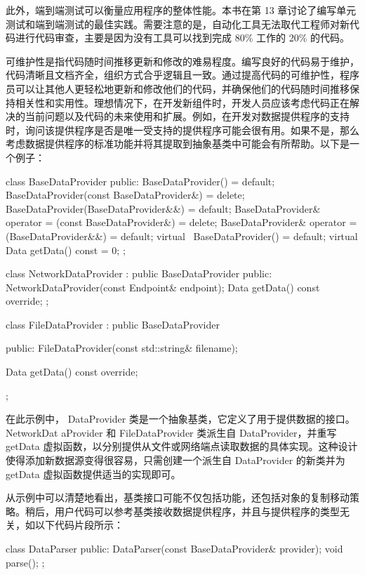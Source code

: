 此外，端到端测试可以衡量应用程序的整体性能。本书在第 13 章讨论了编写单元测试和端到端测试的最佳实践。需要注意的是，自动化工具无法取代工程师对新代码进行代码审查，主要是因为没有工具可以找到完成 80\% 工作的 20\% 的代码。


可维护性是指代码随时间推移更新和修改的难易程度。编写良好的代码易于维护，代码清晰且文档齐全，组织方式合乎逻辑且一致。通过提高代码的可维护性，程序员可以让其他人更轻松地更新和修改他们的代码，并确保他们的代码随时间推移保持相关性和实用性。理想情况下，在开发新组件时，开发人员应该考虑代码正在解决的当前问题以及代码的未来使用和扩展。例如，在开发对数据提供程序的支持时，询问该提供程序是否是唯一受支持的提供程序可能会很有用。如果不是，那么考虑数据提供程序的标准功能并将其提取到抽象基类中可能会有所帮助。以下是一个例子：

\begin{cpp}
class BaseDataProvider {
public:
    BaseDataProvider() = default;
    BaseDataProvider(const BaseDataProvider&) = delete;
    BaseDataProvider(BaseDataProvider&&) = default;
    BaseDataProvider& operator = (const BaseDataProvider&) = delete;
    BaseDataProvider& operator = (BaseDataProvider&&) = default;
    virtual ~BaseDataProvider() = default;
    virtual Data getData() const = 0;
};

class NetworkDataProvider : public BaseDataProvider {
public:
    NetworkDataProvider(const Endpoint& endpoint);
    Data getData() const override;
};

class FileDataProvider : public BaseDataProvider {
public:
    FileDataProvider(const std::string& filename);

    Data getData() const override;
};
\end{cpp}

在此示例中， DataProvider 类是一个抽象基类，它定义了用于提供数据的接口。 NetworkDat aProvider 和 FileDataProvider 类派生自 DataProvider，并重写 getData 虚拟函数，以分别提供从文件或网络端点读取数据的具体实现。这种设计使得添加新数据源变得很容易，只需创建一个派生自 DataProvider 的新类并为 getData 虚拟函数提供适当的实现即可。

从示例中可以清楚地看出，基类接口可能不仅包括功能，还包括对象的复制移动策略。稍后，用户代码可以参考基类接收数据提供程序，并且与提供程序的类型无关，如以下代码片段所示：

\begin{cpp}
class DataParser {
public:
    DataParser(const BaseDataProvider& provider);
    void parse();
};
\end{cpp}

